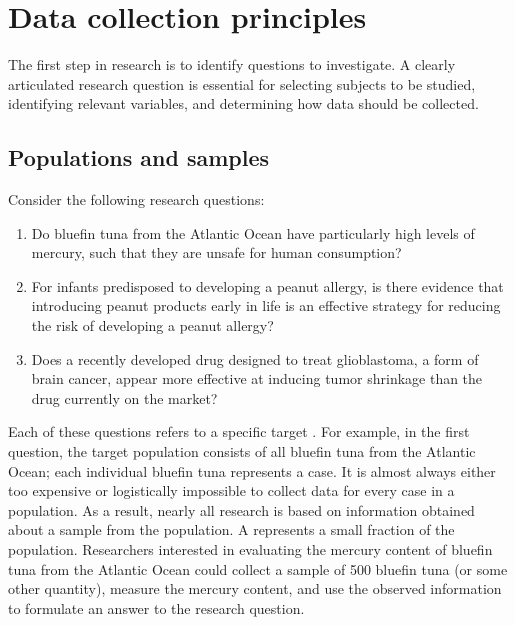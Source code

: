 \section{Data collection principles}
\label{dataCollectionPrinciples}


The first step in research is to identify questions to investigate. A clearly articulated research question is essential for selecting subjects to be studied, identifying relevant variables, and determining how data should be collected.

\subsection{Populations and samples}
\label{populationsAndSamples}

\textD{\noindent}%
Consider the following research questions:

\begin{enumerate}
\setlength{\itemsep}{0mm}

\item Do bluefin tuna from the Atlantic Ocean have particularly high levels of mercury, such that they are unsafe for human consumption?

\item For infants predisposed to developing a peanut allergy, is there evidence that introducing peanut products early in life is an effective strategy for reducing the risk of developing a peanut allergy?

\item Does a recently developed drug designed to treat glioblastoma, a form of brain cancer, appear more effective at inducing tumor shrinkage than the drug currently on the market?
\end{enumerate}

Each of these questions refers to a specific target . For example, in the first question, the target population consists of all bluefin tuna from the Atlantic Ocean; each individual bluefin tuna represents a case. It is almost always either too expensive or logistically impossible to collect data for every case in a population. As a result, nearly all research is based on information obtained about a sample from the population. A  represents a small fraction of the population. Researchers interested in evaluating the mercury content of bluefin tuna from the Atlantic Ocean could collect a sample of 500 bluefin tuna (or some other quantity), measure the mercury content, and use the observed information to formulate an answer to the research question. 


